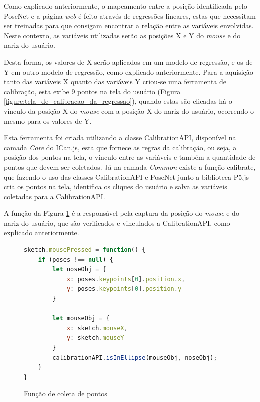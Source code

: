 \par Como explicado anteriormente, o mapeamento entre a posição identificada pelo PoseNet e a página \textit{web} é feito através de regressões lineares, estas que necessitam ser treinadas para que consigam encontrar a relação entre as variáveis envolvidas. Neste contexto, as variáveis utilizadas serão as posições X e Y do \textit{mouse} e do nariz do usuário.

\par Desta forma, os valores de X serão aplicados em um modelo de regressão, e os de Y em outro modelo de regressão, como explicado anteriormente. Para a aquisição tanto das variáveis X quanto das variáveis Y criou-se uma ferramenta de calibração, esta exibe 9 pontos na tela do usuário (Figura \ref{figure:tela_de_calibracao_da_regressao}), quando estas são clicadas há o vínculo da posição X do \textit{mouse} com a posição X do nariz do usuário, ocorrendo o mesmo para os valores de Y.


\par Esta ferramenta foi criada utilizando a classe CalibrationAPI, disponível na camada \textit{Core} do ICan.js, esta que fornece as regras da calibração, ou seja, a posição dos pontos na tela, o vínculo entre as variáveis e também a quantidade de pontos que devem ser coletados. Já na camada \textit{Common} existe a função calibrate, que fazendo o uso das classes CalibrationAPI e PoseNet junto a biblioteca P5.js cria os pontos na tela, identifica os cliques do usuário e salva as variáveis coletadas para a CalibrationAPI. 

\par A função da Figura \ref{figure:funcao_coleta_de_pontos_calibracao} é a responsável pela captura da posição do \textit{mouse} e do nariz do usuário, que são verificados e vinculados a CalibrationAPI, como explicado anteriormente.

\begin{figure}[H]
    \centering
    \begin{lstlisting}[language=JavaScript]
sketch.mousePressed = function() {
    if (poses !== null) {
        let noseObj = {
            x: poses.keypoints[0].position.x,
            y: poses.keypoints[0].position.y
        }
        
        let mouseObj = {
            x: sketch.mouseX,
            y: sketch.mouseY
        }
        calibrationAPI.isInEllipse(mouseObj, noseObj);
    } 
}
    \end{lstlisting}
    \caption{Função de coleta de pontos}
    \label{figure:funcao_coleta_de_pontos_calibracao}
\end{figure}


